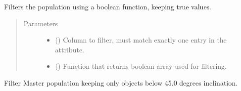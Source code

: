 \documentclass[letterpaper,10pt,english]{sphinxmanual}
\begin{document}
\begin{fulllineitems}
\begin{fulllineitems}
\end{fulllineitems}


\begin{fulllineitems}
\label{\detokenize{modules/population:population.Population.filter}}
Filters the population using a boolean function, keeping true values.
\begin{quote}\begin{description}
\item[{Parameters}] \leavevmode\begin{itemize}
\item {} 
 () \textendash{} Column to filter, must match exactly one entry in the  attribute.

\item {} 
 () \textendash{} Function that returns boolean array used for filtering.

\end{itemize}

\end{description}\end{quote}


Filter Master population keeping only objects below 45.0 degrees inclination.

%
\begin{sphinxVerbatim}[commandchars=\\\{\}]
   

  
        
\end{sphinxVerbatim}

\end{fulllineitems}



\end{fulllineitems}
\end{document}
